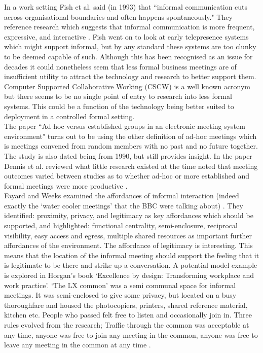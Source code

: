 In a work setting Fish et al. said (in 1993) that ``informal communication cuts across organisational boundaries and often happens spontaneously." They reference research which suggests that informal communication is more frequent, expressive, and interactive \cite{Fish1993}. Fish went on to look at early telepresence systems which might support informal, but by any standard these systems are too clunky to be deemed capable of such. Although this has been recognised as an issue for decades it could nonetheless seem that less formal business meetings are of insufficient utility to attract the technology and research to better support them. Computer Supported Collaborative Working (CSCW) is a well known acronym  but there seems to be no single point of entry to research into less formal systems. This could be a function of the technology being better suited to deployment in a controlled formal setting. \\
The paper ``Ad hoc versus established groups in an electronic meeting system environment" turns out to be using the other definition of ad-hoc meetings which is meetings convened from random members with no past and no future together. The study is also dated being from 1990, but still provides insight. In the paper Dennis et al. reviewed what little research existed at the time noted that meeting outcomes varied between studies as to whether ad-hoc or more established and formal meetings were more productive \cite{Dennis1990}.\\
            Fayard and Weeks examined the affordances of informal interaction (indeed exactly the `water cooler meetings' that the BBC were talking about) \cite{Fayard2007}. They identified: proximity, privacy, and legitimacy as key affordances which should be supported, and highlighted: functional centrality, semi-enclosure, reciprocal visibility, easy access and egress, multiple shared resources as important further affordances of the environment. The affordance of legitimacy is interesting. This means that the location of the informal meeting should support the feeling that it is legitimate to be there and strike up a conversation. 
            A potential model example is explored in Horgan's book `Excellence by design: Transforming workplace and work practice'. `The LX common' was a semi communal space for informal meetings. It was semi-enclosed to give some privacy, but located on a busy thoroughfare and housed the photocopiers, printers, shared reference material, kitchen etc.  People who passed felt free to listen and occasionally join in. Three rules evolved from the research; Traffic through the common was acceptable at any time, anyone was free to join any meeting in the common, anyone was free to leave any meeting in the common at any time \cite{horgen1999excellence}.\\
